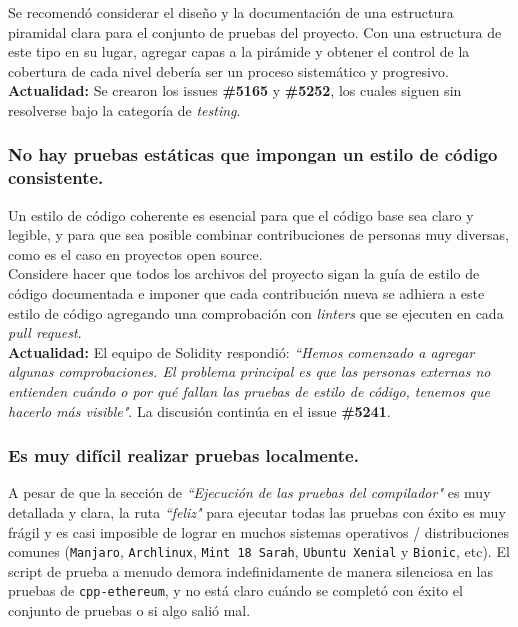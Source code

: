 Se recomendó considerar el diseño y la documentación de una estructura piramidal clara para el conjunto de pruebas del proyecto. Con una estructura de este tipo en su lugar, agregar capas a la pirámide y obtener el control de la cobertura de cada nivel debería ser un proceso sistemático y progresivo.\\

\textbf{Actualidad: }Se crearon los issues \textbf{\#5165}\cite{GHI5165} y \textbf{\#5252}\cite{GHI5252}, los cuales siguen sin resolverse bajo la categoría de \textit{testing}.\\

\subsubsection{No hay pruebas estáticas que impongan un estilo de código consistente.}

Un estilo de código coherente es esencial para que el código base sea claro y legible, y para que sea posible combinar contribuciones de personas muy diversas, como es el caso en proyectos open source.\\

Considere hacer que todos los archivos del proyecto sigan la guía de estilo de código documentada\cite{SolidityStyleGuide} e imponer que cada contribución nueva se adhiera a este estilo de código agregando una comprobación con \textit{linters} que se ejecuten en cada \textit{pull request}.\\

\textbf{Actualidad:} El equipo de Solidity respondió: \textit{``Hemos comenzado a agregar algunas comprobaciones. El problema principal es que las personas externas no entienden cuándo o por qué fallan las pruebas de estilo de código, tenemos que hacerlo más visible"}. La discusión continúa en el issue \textbf{\#5241\cite{GHI5241}}.\\

\subsubsection{Es muy difícil realizar pruebas localmente.}
A pesar de que la sección de \textit{``Ejecución de las pruebas del compilador"}\cite{SolidityContributingTests} es muy detallada y clara, la ruta \textit{``feliz"} para ejecutar todas las pruebas con éxito es muy frágil y es casi imposible de lograr en muchos sistemas operativos / distribuciones comunes (\texttt{Manjaro}, \texttt{Archlinux}, \texttt{Mint 18 Sarah}, \texttt{Ubuntu Xenial} y \texttt{Bionic}, etc). El script de prueba a menudo demora indefinidamente de manera silenciosa en las pruebas de \verb|cpp-ethereum|, y no está claro cuándo se completó con éxito el conjunto de pruebas o si algo salió mal.\\

